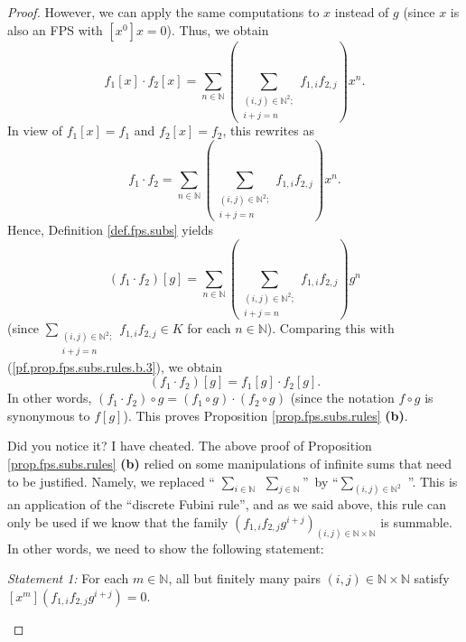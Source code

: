 \begin{proof}
However, we can apply the same computations to $x$ instead of $g$ (since $x$
is also an FPS with $\left[  x^{0}\right]  x=0$). Thus, we obtain%
\[
f_{1}\left[  x\right]  \cdot f_{2}\left[  x\right]  =\sum_{n\in\mathbb{N}%
}\left(  \sum_{\substack{\left(  i,j\right)  \in\mathbb{N}^{2};\\i+j=n}%
}f_{1,i}f_{2,j}\right)  x^{n}.
\]
In view of $f_{1}\left[  x\right]  =f_{1}$ and $f_{2}\left[  x\right]  =f_{2}%
$, this rewrites as%
\[
f_{1}\cdot f_{2}=\sum_{n\in\mathbb{N}}\left(  \sum_{\substack{\left(
i,j\right)  \in\mathbb{N}^{2};\\i+j=n}}f_{1,i}f_{2,j}\right)  x^{n}.
\]
Hence, Definition \ref{def.fps.subs} yields%
\[
\left(  f_{1}\cdot f_{2}\right)  \left[  g\right]  =\sum_{n\in\mathbb{N}%
}\left(  \sum_{\substack{\left(  i,j\right)  \in\mathbb{N}^{2};\\i+j=n}%
}f_{1,i}f_{2,j}\right)  g^{n}%
\]
(since $\sum_{\substack{\left(  i,j\right)  \in\mathbb{N}^{2};\\i+j=n}%
}f_{1,i}f_{2,j}\in K$ for each $n\in\mathbb{N}$). Comparing this with
(\ref{pf.prop.fps.subs.rules.b.3}), we obtain%
\[
\left(  f_{1}\cdot f_{2}\right)  \left[  g\right]  =f_{1}\left[  g\right]
\cdot f_{2}\left[  g\right]  .
\]
In other words, $\left(  f_{1}\cdot f_{2}\right)  \circ g=\left(  f_{1}\circ
g\right)  \cdot\left(  f_{2}\circ g\right)  $ (since the notation $f\circ g$
is synonymous to $f\left[  g\right]  $). This proves Proposition
\ref{prop.fps.subs.rules} \textbf{(b)}. \smallskip

\begin{fineprint}
Did you notice it? I have cheated. The above proof of Proposition
\ref{prop.fps.subs.rules} \textbf{(b)} relied on some manipulations of
infinite sums that need to be justified. Namely, we replaced \textquotedblleft%
$\sum_{i\in\mathbb{N}}\ \ \sum_{j\in\mathbb{N}}$\textquotedblright\ by
\textquotedblleft$\sum_{\left(  i,j\right)  \in\mathbb{N}^{2}}$%
\textquotedblright. This is an application of the \textquotedblleft discrete
Fubini rule\textquotedblright, and as we said above, this rule can only be
used if we know that the family $\left(  f_{1,i}f_{2,j}g^{i+j}\right)
_{\left(  i,j\right)  \in\mathbb{N}\times\mathbb{N}}$ is summable. In other
words, we need to show the following statement:

\begin{statement}
\textit{Statement 1:} For each $m\in\mathbb{N}$, all but finitely many pairs
$\left(  i,j\right)  \in\mathbb{N}\times\mathbb{N}$ satisfy $\left[
x^{m}\right]  \left(  f_{1,i}f_{2,j}g^{i+j}\right)  =0$.
\end{statement}


\end{fineprint}
\end{proof}
